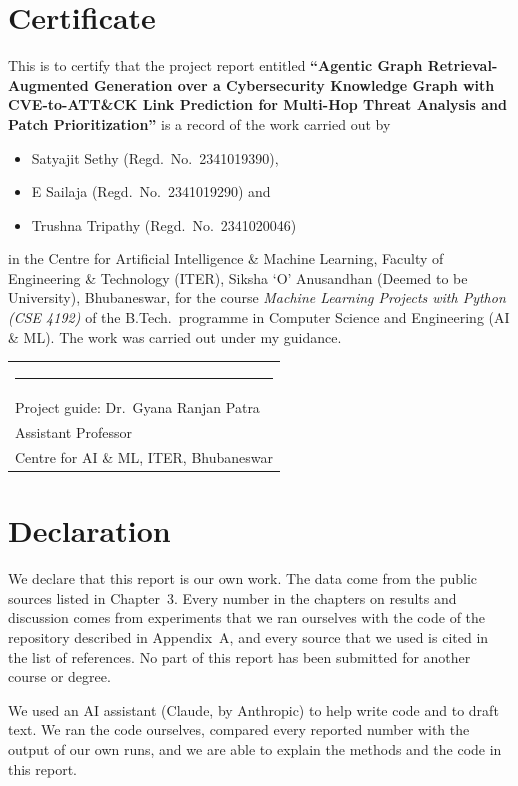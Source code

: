 \documentclass[12pt, a4paper]{article}
\newcommand{\projecttitle}{Agentic Graph Retrieval-Augmented Generation over a Cybersecurity Knowledge Graph with CVE-to-ATT\&CK Link Prediction for \mbox{Multi-Hop} Threat Analysis and Patch Prioritization}
\newcommand{\guidename}{Dr.\ Gyana Ranjan Patra}
\newcommand{\guidedesig}{Assistant Professor}
\newif\ifcert \certtrue                %
\newif\ifaidisclose \aidisclosetrue    %
\begin{document}
\ifcert
\section*{Certificate}
\vspace{0.5cm}
\noindent This is to certify that the project report entitled \textbf{``\projecttitle''} is a record of the work carried out by
\begin{itemize}[noitemsep]
    \item Satyajit Sethy (Regd.\ No.\ 2341019390),
    \item E Sailaja (Regd.\ No.\ 2341019290) and
    \item Trushna Tripathy (Regd.\ No.\ 2341020046)
\end{itemize}
in the Centre for Artificial Intelligence \& Machine Learning, Faculty of Engineering \& Technology (ITER), Siksha `O' Anusandhan (Deemed to be University), Bhubaneswar, for the course \emph{Machine Learning Projects with Python (CSE 4192)} of the B.Tech.\ programme in Computer Science and Engineering (AI \& ML). The work was carried out under my guidance.

\vspace{3cm}
\hfill\begin{tabular}{@{}l@{}}
\rule{6.5cm}{0.4pt} \\
Project guide: \guidename \\
\guidedesig \\
Centre for AI \& ML, ITER, Bhubaneswar \\
\end{tabular}
\newpage
\section*{Declaration}
\vspace{0.3cm}
\noindent We declare that this report is our own work. The data come from the public sources listed in Chapter~3. Every number in the chapters on results and discussion comes from experiments that we ran ourselves with the code of the repository described in Appendix~A, and every source that we used is cited in the list of references. No part of this report has been submitted for another course or degree.
\ifaidisclose

\noindent We used an AI assistant (Claude, by Anthropic) to help write code and to draft text. We ran the code ourselves, compared every reported number with the output of our own runs, and we are able to explain the methods and the code in this report.
\fi
\end{document}
